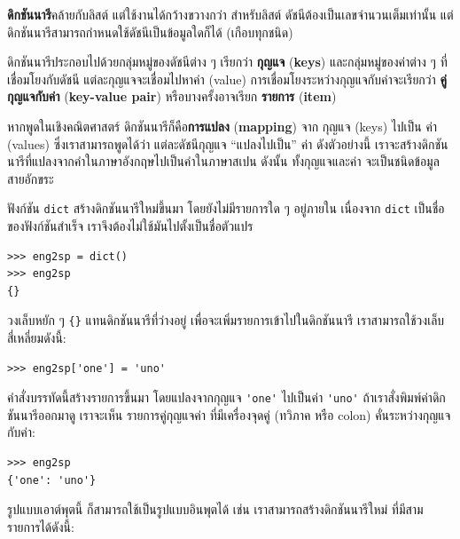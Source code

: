 
\textbf{ดิกชันนารี}คล้ายกับลิสต์ แต่ใช้งานได้กว้างขวางกว่า
สำหรับลิสต์ ดัชนีต้องเป็นเลขจำนวนเต็มเท่านั้น
แต่ดิกชันนารีสามารถกำหนดใช้ดัชนีเป็นข้อมูลใดก็ได้ (เกือบทุกชนิด)

ดิกชันนารีประกอบไปด้วยกลุ่มหมู่ของดัชนีต่าง ๆ เรียกว่า \textbf{กุญแจ} (\textbf{keys}) และกลุ่มหมู่ของค่าต่าง ๆ ที่เชื่อมโยงกับดัชนี
แต่ละกุญแจจะเชื่อมไปหาค่า (value)
การเชื่อมโยงระหว่างกุญแจกับค่าจะเรียกว่า \textbf{คู่กุญแจกับค่า} (\textbf{key-value pair}) หรือบางครั้งอาจเรียก \textbf{รายการ} (\textbf{item})  

หากพูดในเชิงคณิตศาสตร์ ดิกชันนารีก็คือ\textbf{การแปลง} (\textbf{mapping}) จาก กุญแจ (keys) ไปเป็น ค่า (values)
ซึ่งเราสามารถพูดได้ว่า แต่ละดัชนีกุญแจ ``แปลงไปเป็น'' ค่า
ดังตัวอย่างนี้ เราจะสร้างดิกชันนารีที่แปลงจากคำในภาษาอังกฤษไปเป็นคำในภาษาสเปน
ดังนั้น ทั้งกุญแจและค่า จะเป็นชนิดข้อมูลสายอักขระ

ฟังก์ชัน \texttt{dict} สร้างดิกชันนารีใหม่ขึ้นมา โดยยังไม่มีรายการใด ๆ อยู่ภายใน
เนื่องจาก \texttt{dict} เป็นชื่อของฟังก์ชันสำเร็จ
เราจึงต้องไม่ใช้มันไปตั้งเป็นชื่อตัวแปร

\begin{verbatim}
>>> eng2sp = dict()
>>> eng2sp
{}
\end{verbatim}

วงเล็บหยัก ๆ \verb|{}| แทนดิกชันนารีที่ว่างอยู่
เพื่อจะเพิ่มรายการเข้าไปในดิกชันนารี เราสามารถใช้วงเล็บสี่เหลี่ยมดังนี้:

\begin{verbatim}
>>> eng2sp['one'] = 'uno'
\end{verbatim}
%
คำสั่งบรรทัดนี้สร้างรายการขึ้นมา
โดยแปลงจากกุญแจ \verb|'one'| ไปเป็นค่า \verb|'uno'|
ถ้าเราสั่งพิมพ์ค่าดิกชันนารีออกมาดู
เราจะเห็น รายการคู่กุญแจค่า ที่มีเครื่องจุดคู่ (ทวิภาค หรือ colon) คั่นระหว่างกุญแจกับค่า:

\begin{verbatim}
>>> eng2sp
{'one': 'uno'}
\end{verbatim}
%
รูปแบบเอาต์พุตนี้ ก็สามารถใช้เป็นรูปแบบอินพุตได้
เช่น เราสามารถสร้างดิกชันนารีใหม่ ที่มีสามรายการได้ดังนี้:

